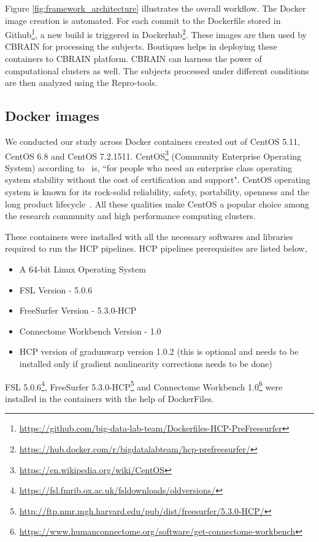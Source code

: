 Figure \ref{fig:framework_architecture} illustrates the overall workflow. The Docker image creation is automated. For each commit to the Dockerfile stored in Github\footnote{\url{https://github.com/big-data-lab-team/Dockerfiles-HCP-PreFreesurfer}}, a new build is triggered in Dockerhub\footnote{\url{https://hub.docker.com/r/bigdatalabteam/hcp-prefreesurfer/}}. These images are then used by CBRAIN for processing the subjects. Boutiques helps in deploying these containers to CBRAIN platform. CBRAIN can harness the power of computational clusters as well. The subjects processed under different conditions are then analyzed using the Repro-tools.

\subsection{Docker images}
We conducted our study across Docker containers created out of CentOS 5.11, CentOS 6.8 and CentOS 7.2.1511. CentOS\footnote{\url{https://en.wikipedia.org/wiki/CentOS}} (Community Enterprise Operating System) according to~\cite{CentOS} is, ``for people who need an enterprise class operating system stability without the cost of certification and support". CentOS operating system is known for its rock-solid reliability, safety, portability, openness and the long product lifecycle~\cite{5665431}. All these qualities make CentOS a popular choice among the research community and high performance computing clusters.

These containers were installed with all the necessary softwares and libraries required to run the HCP pipelines. HCP pipelines prerequisites are listed below,

\begin{itemize}
 \item A 64-bit Linux Operating System
 \item FSL Version - 5.0.6
 \item FreeSurfer Version - 5.3.0-HCP
 \item Connectome Workbench Version - 1.0
 \item HCP version of gradunwarp version 1.0.2 (this is optional and needs to be installed only if gradient nonlinearity corrections needs to be done)
\end{itemize}

FSL 5.0.6\footnote{\url{https://fsl.fmrib.ox.ac.uk/fsldownloads/oldversions/}}, FreeSurfer 5.3.0-HCP\footnote{\url{http://ftp.nmr.mgh.harvard.edu/pub/dist/freesurfer/5.3.0-HCP/}} and Connectome Workbench 1.0\footnote{\url{https://www.humanconnectome.org/software/get-connectome-workbench}} were installed in the containers with the help of DockerFiles.

